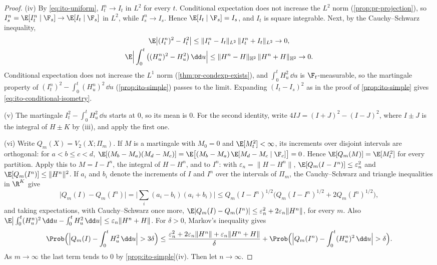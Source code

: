 \begin{proof}
(iv) By \eqref{eq:ito-uniform}, $I^n_t\to I_t$ in $L^2$ for every $t$. Conditional
expectation does not increase the $L^2$ norm (\cref{prop:pr-projection}), so
$I^n_s=\E[I^n_t\mid\F_s]\to\E[I_t\mid\F_s]$ in $L^2$, while $I^n_s\to I_s$. Hence
$\E[I_t\mid\F_s]=I_s$, and $I_t$ is square integrable. Next, by the Cauchy--Schwarz
inequality,
\begin{gather*}
  \E\big|(I^n_t)^2-I_t^2\big|\le\|I^n_t-I_t\|_{L^2}\,\|I^n_t+I_t\|_{L^2}\to0,\\
  \E\Big|\int_0^t\big((H^n_u)^2-H_u^2\big)\,\dd u\Big|\le\|H^n-H\|_{\mathbb H^2}\,
  \|H^n+H\|_{\mathbb H^2}\to0 .
\end{gather*}
Conditional expectation does not increase the $L^1$ norm (\cref{thm:pr-condexp-exists}), and
$\int_0^tH_u^2\,\dd u$ is $\F_t$-measurable, so the martingale property of
$(I^n_t)^2-\int_0^t(H^n_u)^2\,\dd u$ (\cref{prop:ito-simple}) passes to the limit. Expanding
$(I_t-I_s)^2$ as in the proof of \cref{prop:ito-simple} gives
\eqref{eq:ito-conditional-isometry}.

(v) The martingale $I_t^2-\int_0^tH_u^2\,\dd u$ starts at $0$, so its mean is $0$. For the
second identity, write $4IJ=(I+J)^2-(I-J)^2$, where $I\pm J$ is the integral of $H\pm K$
by (iii), and apply the first one.

(vi) Write $Q_m(X)=V_2(X;\Pi_m)$. If $M$ is a martingale with $M_0=0$ and $\E[M_t^2]<\infty$,
its increments over disjoint intervals are orthogonal: for $a<b\le c<d$,
$\E[(M_b-M_a)(M_d-M_c)]=\E\big[(M_b-M_a)\,\E[M_d-M_c\mid\F_c]\big]=0$. Hence
$\E[Q_m(M)]=\E[M_t^2]$ for every partition. Apply this to $M=I-I^n$, the integral of $H-H^n$,
and to $I^n$: with $\varepsilon_n=\|H-H^n\|$,
$\E[Q_m(I-I^n)]\le\varepsilon_n^2$ and $\E[Q_m(I^n)]\le\|H^n\|^2$. If $a_i$ and $b_i$ denote
the increments of $I$ and $I^n$ over the intervals of $\Pi_m$, the Cauchy--Schwarz and
triangle inequalities in $\R^K$ give
\[
  \big|Q_m(I)-Q_m(I^n)\big|=\Big|\sum_i(a_i-b_i)(a_i+b_i)\Big|
  \le Q_m(I-I^n)^{1/2}\big(Q_m(I-I^n)^{1/2}+2Q_m(I^n)^{1/2}\big),
\]
and taking expectations, with Cauchy--Schwarz once more,
$\E|Q_m(I)-Q_m(I^n)|\le\varepsilon_n^2+2\varepsilon_n\|H^n\|$, for every $m$. Also
$\E\big|\int_0^t(H^n_u)^2\,\dd u-\int_0^tH_u^2\,\dd u\big|\le\varepsilon_n\|H^n+H\|$. For
$\delta>0$, Markov's inequality gives
\[
  \Prob\Big(\Big|Q_m(I)-\int_0^tH_u^2\,\dd u\Big|>3\delta\Big)\le
  \frac{\varepsilon_n^2+2\varepsilon_n\|H^n\|+\varepsilon_n\|H^n+H\|}{\delta}
  +\Prob\Big(\Big|Q_m(I^n)-\int_0^t(H^n_u)^2\,\dd u\Big|>\delta\Big).
\]
As $m\to\infty$ the last term tends to $0$ by \cref{prop:ito-simple}(iv). Then let
$n\to\infty$.
\end{proof}

